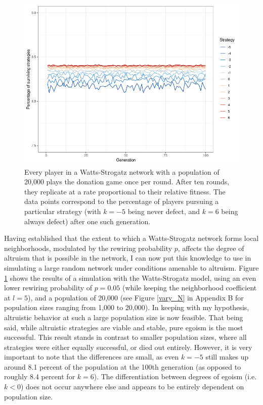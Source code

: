 \documentclass{JASSS}
\begin{document}
\begin{figure}
	\centering
	\includegraphics[width=\linewidth]{./figures/results_N20000_truthful_new.png}
	\caption{Every player in a Watts-Strogatz network with a population of 20,000 plays the donation game once per round. After ten rounds, they replicate at a rate proportional to their relative fitness. The data points correspond to the percentage of players pursuing a particular strategy (with $k=-5$ being never defect, and $k=6$ being always defect) after one such generation.}
	\label{WS_20000_default}
\end{figure}

Having established that the extent to which a Watts-Strogatz network forms local neighborhoods, modulated by the rewiring probability $p$, affects the degree of altruism that is possible in the network, I can now put this knowledge to use in simulating a large random network under conditions amenable to altruism. Figure \ref{WS_20000_default} shows the results of a simulation with the Watts-Strogatz model, using an even lower rewiring probability of $p=0.05$ (while keeping the neighborhood coefficient at $l=5$), and a population of 20,000 (see Figure \ref{vary_N} in Appendix B for population sizes ranging from 1,000 to 20,000). In keeping with my hypothesis, altruistic behavior at such a large population size is now feasible. That being said, while altruistic strategies are viable and stable, pure egoism is the most successful. This result stands in contrast to smaller population sizes, where all strategies were either equally successful, or died out entirely. However, it is very important to note that the differences are small, as even $k=-5$ still makes up around 8.1 percent of the population at the 100th generation (as opposed to roughly 8.4 percent for $k=6$). The differentiation between degrees of egoism (i.e. $k<0$) does not occur anywhere else and appears to be entirely dependent on population size.
\end{document}
